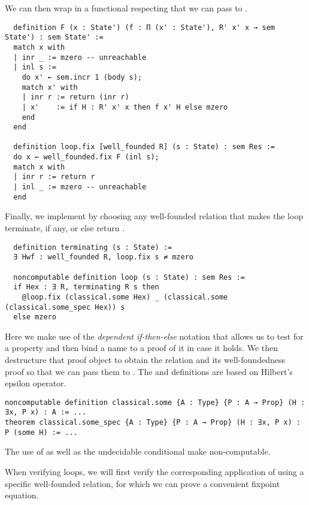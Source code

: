 We can then wrap  in a functional respecting  that we can pass to .

\begin{verbatim}
  definition F (x : State') (f : Π (x' : State'), R' x' x → sem State') : sem State' :=
  match x with
  | inr _ := mzero -- unreachable
  | inl s :=
    do x' ← sem.incr 1 (body s);
    match x' with
    | inr r := return (inr r)
    | x'    := if H : R' x' x then f x' H else mzero
    end
  end

  definition loop.fix [well_founded R] (s : State) : sem Res :=
  do x ← well_founded.fix F (inl s);
  match x with
  | inr r := return r
  | inl _ := mzero -- unreachable
  end
\end{verbatim}

Finally, we implement  by choosing any well-founded relation  that makes
the loop terminate, if any, or else return .

\begin{verbatim}
  definition terminating (s : State) :=
  ∃ Hwf : well_founded R, loop.fix s ≠ mzero

  noncomputable definition loop (s : State) : sem Res :=
  if Hex : ∃ R, terminating R s then
    @loop.fix (classical.some Hex) _ (classical.some (classical.some_spec Hex)) s
  else mzero
\end{verbatim}

Here we make use of the \emph{dependent if-then-else} notation that allows us to
test for a property and then bind a name to a proof of it in case it holds. We
then destructure that proof object to obtain the relation and its
well-foundedness proof so that we can pass them to . The
 and  definitions are based on
Hilbert's epsilon operator.

\begin{verbatim}
noncomputable definition classical.some {A : Type} {P : A → Prop} (H : ∃x, P x) : A := ...
theorem classical.some_spec {A : Type} {P : A → Prop} (H : ∃x, P x) : P (some H) := ...
\end{verbatim}

The use of  as well as the undecidable conditional
 make  non-computable.

When verifying loops, we will first verify the corresponding application of
 using a specific well-founded relation, for which we can prove a
convenient fixpoint equation.

